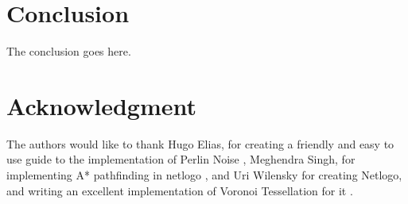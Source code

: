 \documentclass[conference]{IEEEtran}
\begin{document}




\section{Conclusion}
The conclusion goes here.






\section*{Acknowledgment}

The authors would like to thank Hugo Elias, for creating a friendly and easy to use guide to the implementation of Perlin Noise \cite{elias:perlin}, Meghendra Singh, for implementing A* pathfinding in netlogo \cite{singh:astar}, and Uri Wilensky for creating Netlogo, and writing an excellent implementation of Voronoi Tessellation for it \cite{wilensky:voronoi} \cite{wilensky:netlogo}.






\end{document}
